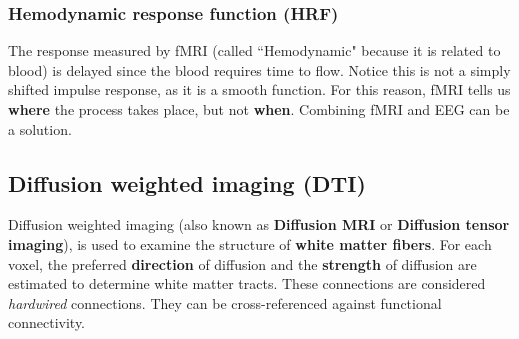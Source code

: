 \subsubsection{Hemodynamic response function (HRF)}
The response measured by fMRI (called ``Hemodynamic" because it is related to blood) is delayed since the blood requires time to flow. Notice this is not a simply shifted impulse response, as it is a smooth function.
For this reason, fMRI tells us \textbf{where} the process takes place, but not \textbf{when}. Combining fMRI and EEG can be a solution.

\subsection{Diffusion weighted imaging (DTI)}
Diffusion weighted imaging (also known as \textbf{Diffusion MRI} or \textbf{Diffusion tensor imaging}), is used to examine the structure of \textbf{white matter fibers}.
For each voxel, the preferred \textbf{direction} of diffusion and the \textbf{strength} of diffusion are estimated to determine white matter tracts.
These connections are considered \textit{hardwired} connections. They can be cross-referenced against functional connectivity.
